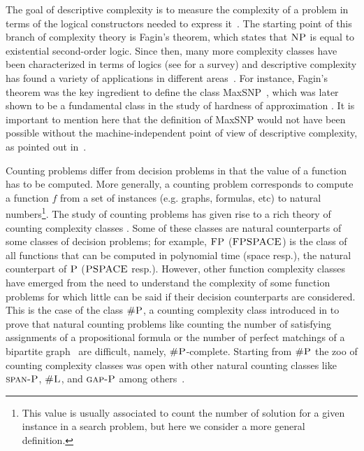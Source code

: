 
%
%
%	
%	
%	
%	
%

The goal of descriptive complexity is to measure the complexity of a problem in terms of the logical constructors needed to express it~\cite{immerman1999descriptive}. 
The starting point of this branch of complexity theory is Fagin's theorem, which states that $\text{\sc NP}$ is equal to existential second-order logic. Since then, many more complexity classes have been characterized in terms of logics (see \cite{G07} for a survey) and descriptive complexity has found a variety of applications in different areas~\cite{immerman1999descriptive, L04}.
For instance, Fagin's theorem was the key ingredient to define the class {\sc MaxSNP}~\cite{PY91}, which was later shown to be a fundamental class in the study of hardness of approximation \cite{ALMSS98}. 
It is important to mention here that the definition of {\sc MaxSNP} would not have been possible without the machine-independent point of view of descriptive complexity, as pointed out in~\cite{PY91}.

Counting problems differ from decision problems in that the value of a function has to be computed.
More generally, a counting problem corresponds to compute a function $f$ from a set of instances (e.g. graphs, formulas, etc) to natural numbers\footnote{This value is usually associated to count the number of solution for a given instance in a search problem, but here we consider a more general definition.}. 
The study of counting problems has given rise to a rich theory of counting complexity classes \cite{HV95,F97,arora2009computational}. Some of these classes are natural counterparts of some classes of decision problems; for example, $\text{\sc FP}$ ($\text{\sc FPSPACE}$) is the class of all functions that can be computed in polynomial time (space resp.), the natural counterpart of $\text{\sc P}$ ($\text{\sc PSPACE}$ resp.). 
However, other function complexity classes have emerged from the need to understand the complexity of some function problems for which little can be said if their decision counterparts are considered. This is the case of the class $\text{\sc \#P}$, a counting complexity class introduced in \cite{Valiant79} to prove that natural counting problems like counting the number of satisfying assignments of a propositional formula or the number of perfect matchings of a bipartite graph~\cite{Valiant79} are difficult, namely, $\text{\sc \#P}$-complete.
Starting from $\text{\sc \#P}$ the zoo of counting complexity classes was open with other natural counting classes like $\text{\sc span-P}$, $\text{\sc \#L}$, and $\text{\sc gap-P}$ among others~\cite{HV95,F97}.

